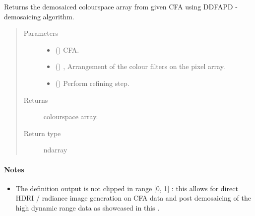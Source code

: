 \documentclass[letterpaper,10pt,english]{sphinxmanual}
\begin{document}
\begin{fulllineitems}
\label{\detokenize{generated/colour_demosaicing.demosaicing_CFA_Bayer_Menon2007:colour_demosaicing.demosaicing_CFA_Bayer_Menon2007}}
Returns the demosaiced  colourspace array from given  CFA using
DDFAPD -  demosaicing algorithm.
\begin{quote}\begin{description}
\item[{Parameters}] \leavevmode\begin{itemize}
\item {} 
 () \textendash{}  CFA.

\item {} 
 (\sphinxstyleliteralemphasis{, }) \textendash{} ,
Arrangement of the colour filters on the pixel array.

\item {} 
 () \textendash{} Perform refining step.

\end{itemize}

\item[{Returns}] \leavevmode
{} colourspace array.

\item[{Return type}] \leavevmode
ndarray

\end{description}\end{quote}
\paragraph{Notes}
\begin{itemize}
\item {} 
The definition output is not clipped in range {[}0, 1{]} : this allows for
direct HDRI / radiance image generation on  CFA data and post
demosaicing of the high dynamic range data as showcased in this
.


\end{itemize}
\end{fulllineitems}
\end{document}
